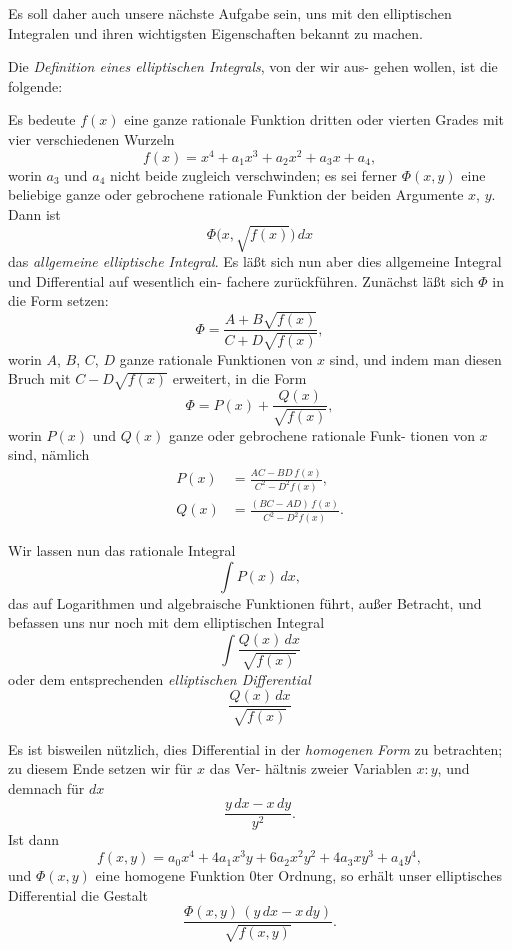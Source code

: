 \documentclass[12pt,a4paper]{book}
\theoremstyle{definition}
\begin{document}
Es soll daher auch unsere n\"achste Aufgabe sein, uns mit
den elliptischen Integralen und ihren wichtigsten Eigenschaften
bekannt zu machen.

Die \emph{Definition eines elliptischen Integrals}, von der wir aus-
gehen wollen, ist die folgende:

Es bedeute $f(x)$ eine ganze rationale Funktion dritten oder vierten Grades mit vier verschiedenen Wurzeln
\begin{equation}\label{eq:1}
f(x) = x^4 + a_1 x^3 + a_2 x^2 + a_3 x + a_4,
\end{equation}
worin $a_3$ und $a_4$ nicht beide zugleich verschwinden; es sei ferner $\Phi(x,y)$ eine beliebige ganze oder gebrochene rationale Funktion der beiden Argumente $x$, $y$. Dann ist
\[
\Phi\bigl(x, \sqrt{f(x)}\bigr)\,dx
\]
das \emph{allgemeine elliptische Integral}. Es l\"a\ss t sich nun
aber dies allgemeine Integral und Differential auf wesentlich ein-
fachere zur\"uckf\"uhren. Zun\"achst l\"a\ss t sich $\Phi$ in die Form setzen:
\[
\Phi = \frac{A + B\sqrt{f(x)}}{C + D\sqrt{f(x)}},
\]
worin $A$, $B$, $C$, $D$ ganze rationale Funktionen von $x$ sind, und
indem man diesen Bruch mit $C - D\sqrt{f(x)}$ erweitert, in die Form
\[
\Phi = P(x) + \frac{Q(x)}{\sqrt{f(x)}},
\]
worin $P(x)$ und $Q(x)$ ganze oder gebrochene rationale Funk-
tionen von $x$ sind, n\"amlich
\begin{equation}
\begin{aligned}
P(x) &= \frac{AC - BD\,f(x)}{C^2 - D^2 f(x)},\\
Q(x) &= \frac{(BC - AD)\,f(x)}{C^2 - D^2 f(x)}.
\end{aligned}
\end{equation}

Wir lassen nun das rationale Integral
\[
\int P(x)\,dx,
\]
das auf Logarithmen und algebraische Funktionen f\"uhrt, au\ss er
Betracht, und befassen uns nur noch mit dem elliptischen Integral
\[
\int \frac{Q(x)\,dx}{\sqrt{f(x)}}
\]
oder dem entsprechenden \emph{elliptischen Differential}
\begin{equation}\label{eq:3}
\frac{Q(x)\,dx}{\sqrt{f(x)}} \tag{3}
\end{equation}

Es ist bisweilen n\"utzlich, dies Differential in der \emph{homogenen
Form} zu betrachten; zu diesem Ende setzen wir f\"ur $x$ das Ver-
h\"altnis zweier Variablen $x:y$, und demnach f\"ur $dx$
\[
\frac{y\,dx - x\,dy}{y^2}.
\]
Ist dann
\[
f(x,y) = a_0 x^4 + 4a_1 x^3 y + 6a_2 x^2 y^2 + 4a_3 x y^3 + a_4 y^4,
\]
und $\Phi(x,y)$ eine homogene Funktion $0$ter Ordnung, so erh\"alt
unser elliptisches Differential die Gestalt
\begin{equation}
\frac{\Phi(x,y)\,(y\,dx - x\,dy)}{\sqrt{f(x,y)}}. \tag{$3'$}
\end{equation}
\end{document}
